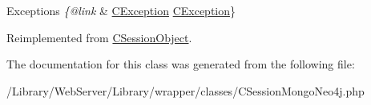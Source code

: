 \begin{DoxyExceptions}{Exceptions}
{\em \{@link} & \hyperlink{class_c_exception}{C\-Exception} \hyperlink{class_c_exception}{C\-Exception}\} \\
\hline
\end{DoxyExceptions}


Reimplemented from \hyperlink{class_c_session_object_aefd5962093881fa488ccf86f6f717a20}{C\-Session\-Object}.



The documentation for this class was generated from the following file\-:\begin{DoxyCompactItemize}
\item 
/\-Library/\-Web\-Server/\-Library/wrapper/classes/C\-Session\-Mongo\-Neo4j.\-php\end{DoxyCompactItemize}
